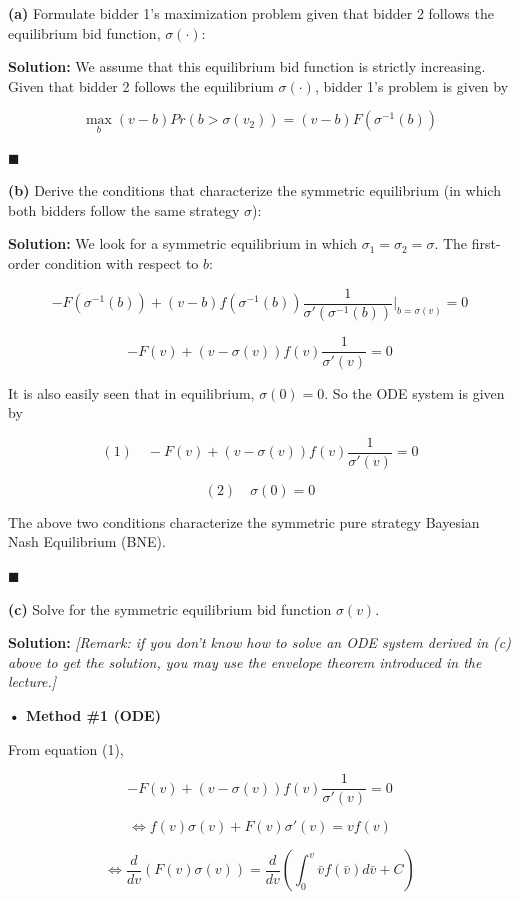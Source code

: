 \documentclass[12pt, oneside]{article}
\begin{document}
\noindent
\textbf{(a)} Formulate bidder 1’s maximization problem given that bidder 2 follows the equilibrium bid function, \( \sigma(\cdot) \):

\noindent
\textbf{Solution:} We assume that this equilibrium bid function is strictly increasing. Given that bidder 2 follows the equilibrium \( \sigma(\cdot) \), bidder 1’s problem is given by

\[
\max_b (v - b) Pr(b > \sigma(v_2)) = (v - b) F(\sigma^{-1}(b))
\]

\(\blacksquare\)

\noindent
\textbf{(b)} Derive the conditions that characterize the symmetric equilibrium (in which both bidders follow the same strategy \( \sigma \)):

\noindent
\textbf{Solution:} We look for a symmetric equilibrium in which \( \sigma_1 = \sigma_2 = \sigma \). The first-order condition with respect to \( b \):

\[
- F(\sigma^{-1}(b)) + (v - b) f(\sigma^{-1}(b)) \frac{1}{\sigma'(\sigma^{-1}(b))} \Bigg|_{b = \sigma(v)} = 0
\]

\[
- F(v) + (v - \sigma(v)) f(v) \frac{1}{\sigma'(v)} = 0
\]

It is also easily seen that in equilibrium, \( \sigma(0) = 0 \). So the ODE system is given by

\[
(1) \quad -F(v) + (v - \sigma(v)) f(v) \frac{1}{\sigma'(v)} = 0
\]

\[
(2) \quad \sigma(0) = 0
\]

The above two conditions characterize the symmetric pure strategy Bayesian Nash Equilibrium (BNE).

\(\blacksquare\)

\noindent
\textbf{(c)} Solve for the symmetric equilibrium bid function \( \sigma(v) \). 

\noindent
\textbf{Solution:} \textit{[Remark: if you don’t know how to solve an ODE system derived in (c) above to get the solution, you may use the envelope theorem introduced in the lecture.]}

\textbf{• Method \#1 (ODE)}

From equation (1),

\[
- F(v) + (v - \sigma(v)) f(v) \frac{1}{\sigma'(v)} = 0
\]

\[
\Leftrightarrow f(v) \sigma(v) + F(v) \sigma'(v) = v f(v)
\]

\[
\Leftrightarrow \frac{d}{dv} (F(v) \sigma(v)) = \frac{d}{dv} \left(\int_0^v \bar{v} f(\bar{v}) d\bar{v} + C \right)
\]
\end{document}
